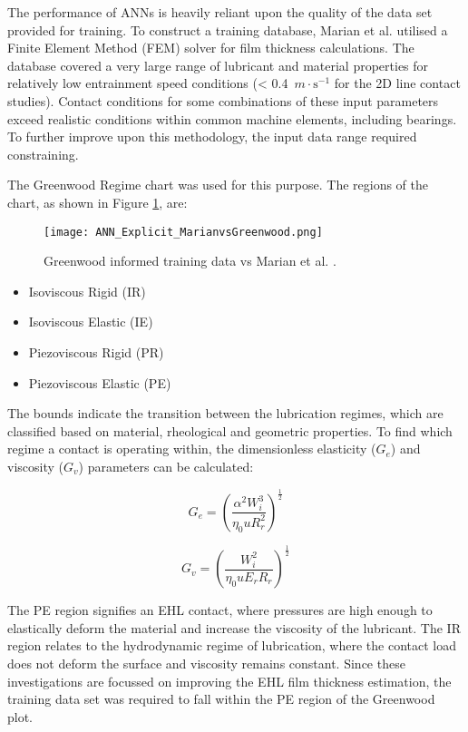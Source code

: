 The performance of ANNs is heavily reliant upon the quality of the data set provided for training. To construct a training database, Marian et al. \cite{Marian2022} utilised a Finite Element Method (FEM) solver for film thickness calculations. The database covered a very large range of lubricant and material properties for relatively low entrainment speed conditions (< 0.4~$m \cdot \mathrm{s}^{-1}$ for the 2D line contact studies). Contact conditions for some combinations of these input parameters exceed realistic conditions within common machine elements, including bearings. To further improve upon this methodology, the input data range required constraining.

The Greenwood Regime chart \cite{Johnson1970} was used for this purpose. The regions of the chart, as shown in Figure \ref{Greenwood informed training data vs Marian et al.}, are:

\begin{figure}
	\centering  
	\texttt{[image: ANN\_Explicit\_MarianvsGreenwood.png]}
	\caption[Greenwood informed training data vs Marian et al.]{Greenwood informed training data vs Marian et al. \cite{Marian2022}.}
	\label{Greenwood informed training data vs Marian et al.}
\end{figure} 

\begin{itemize}
	\item Isoviscous Rigid (IR)
	\item Isoviscous Elastic (IE)
	\item Piezoviscous Rigid (PR)
	\item Piezoviscous Elastic (PE)
\end{itemize}

The bounds indicate the transition between the lubrication regimes, which are classified based on material, rheological and geometric properties. To find which regime a contact is operating within, the dimensionless elasticity ($G_e$) and viscosity ($G_v$) parameters can be calculated:

\begin{equation}\label{G_e}
	G_e=\left(\frac{\alpha^2 W_i^3}{\eta_0 u R_r^2}\right)^{\frac{1}{2}}
\end{equation}

\begin{equation}\label{G_v}
	G_v=\left(\frac{W_i^2}{\eta_0 u E_r R_r}\right)^{\frac{1}{2}}
\end{equation}

The PE region signifies an EHL contact, where pressures are high enough to elastically deform the material and increase the viscosity of the lubricant. The IR region relates to the hydrodynamic regime of lubrication, where the contact load does not deform the surface and viscosity remains constant. Since these investigations are focussed on improving the EHL film thickness estimation, the training data set was required to fall within the PE region of the Greenwood plot. 

